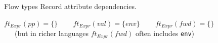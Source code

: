 \documentclass[notes,11pt,aspectratio=169]{beamer}
\begin{document}
\newcommand{\tname}[3]{
\draw[gray] ($(#1,#2*\ys)$) node{#3};
\draw[gray] ($(#1+0.4,\ys*#2+0.25)$) --
            ($(#1-0.4,\ys*#2+0.25)$) arc (90:270:2.5mm);

\draw[gray] ($(#1+0.4,\ys*#2+0.25)$) arc (90:-90:2.5mm) -- 
            ($(#1-0.4,\ys*#2-0.25)$) ;

}

\begin{frame}[t]{Flow types}
Record attribute dependencies. \ \ 

\bigskip
$ft_{Expr}(pp) = \{ \}$  \ \ \ 
%
$ft_{Expr}(val) = \{ env \}$ \ \ \ 
%
$ft_{Expr}(fwd) = \{ \}$ \\
\ \ \  {\small (but in richer languages $ft_{Expr}(fwd)$ often includes \texttt{env})}

\bigskip
{}

\end{frame}
\end{document}
